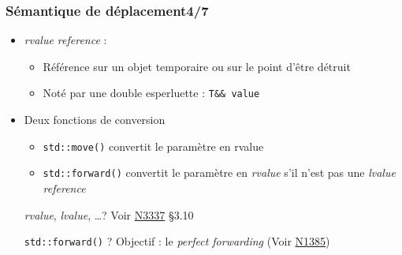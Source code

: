 \documentclass[C++.tex]{subfiles}
\begin{document}
\begin{frame}[fragile]
	\frametitle{Sémantique de déplacement\titlehfill{}4/7}
	\begin{itemize}
		\item \textit{rvalue reference} :
		\begin{itemize}
			\item Référence sur un objet temporaire ou sur le point d'être détruit
			\item Noté par une double esperluette : \lstinline|T&& value|
		\end{itemize}
		\item Deux fonctions \og de conversion\fg{}
		\begin{itemize}
			\item \lstinline|std::move()| convertit le paramètre en rvalue


			\item \lstinline|std::forward()| convertit le paramètre en \textit{rvalue} s'il n'est pas une \textit{lvalue reference}
		\end{itemize}

		\begin{block}{\textit{rvalue}, \textit{lvalue}, \ldots ?}
			Voir \href{http://www.open-std.org/jtc1/sc22/wg21/docs/papers/2012/n3337.pdf}{N3337} §3.10
		\end{block}

		\begin{block}{\lstinline|std::forward()| ?}
			Objectif : le \textit{perfect forwarding} (Voir \href{http://www.open-std.org/jtc1/sc22/wg21/docs/papers/2002/n1385.htm}{N1385})
		\end{block}
	\end{itemize}
\end{frame}
\end{document}
